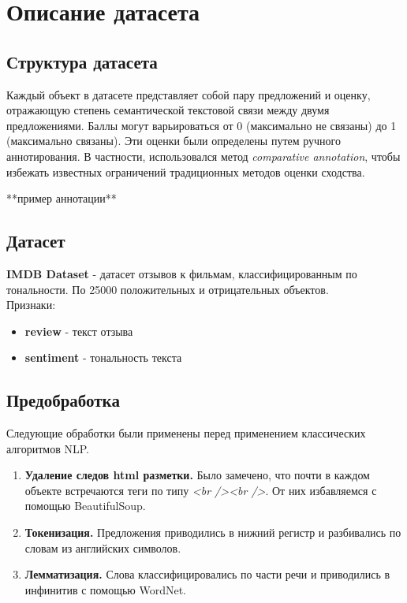 \documentclass[12pt]{article}
\begin{document}
\newpage

\section{Описание датасета}
\subsection{Структура датасета}
Каждый объект в датасете представляет собой пару предложений и оценку, отражающую степень семантической текстовой связи между двумя предложениями. Баллы могут варьироваться от 0 (максимально не связаны) до 1 (максимально связаны). Эти оценки были определены путем ручного аннотирования. В частности, использовался метод \textit{comparative annotation}, чтобы избежать известных ограничений традиционных методов оценки сходства.

**пример аннотации** 

\subsection{Датасет}
\textbf{IMDB Dataset} - датасет отзывов к фильмам, классифицированным по тональности. По 25000 положительных и отрицательных объектов. \\
Признаки:
\begin{itemize}
    \item \textbf{review} - текст отзыва
    \item \textbf{sentiment} - тональность текста
\end{itemize}

\subsection{Предобработка}
Следующие обработки были применены перед применением классических алгоритмов NLP. 

\begin{enumerate}
    \item \textbf{Удаление следов html разметки.}
    Было замечено, что почти в каждом объекте встречаются теги по типу \textit{<br /><br />}. От них избавляемся с помощью BeautifulSoup.

    \item \textbf{Токенизация.}
    Предложения приводились в нижний регистр и разбивались по словам из английских символов.

    \item \textbf{Лемматизация.}
    Слова классифицировались по части речи и приводились в инфинитив с помощью WordNet.
\end{enumerate}
\newpage
\end{document}
